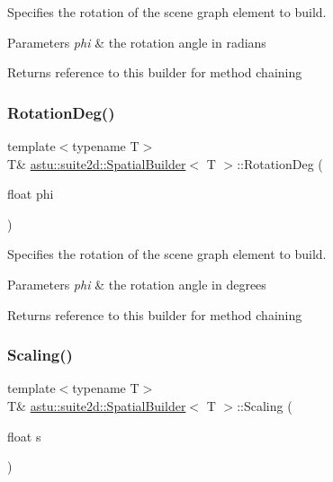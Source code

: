 Specifies the rotation of the scene graph element to build.


\begin{DoxyParams}{Parameters}
{\em phi} & the rotation angle in radians \\
\hline
\end{DoxyParams}
\begin{DoxyReturn}{Returns}
reference to this builder for method chaining 
\end{DoxyReturn}
\mbox{\label{classastu_1_1suite2d_1_1SpatialBuilder_aebb7300a60d30a4bf07723b977718e11}} 
\subsubsection{\texorpdfstring{Rotation\+Deg()}{RotationDeg()}}
{\footnotesize\ttfamily template$<$typename T$>$ \\
T\& \hyperlink{classastu_1_1suite2d_1_1SpatialBuilder}{astu\+::suite2d\+::\+Spatial\+Builder}$<$ T $>$\+::Rotation\+Deg (\begin{DoxyParamCaption}\item[{float}]{phi }\end{DoxyParamCaption})\hspace{0.3cm}{\ttfamily [inline]}}

Specifies the rotation of the scene graph element to build.


\begin{DoxyParams}{Parameters}
{\em phi} & the rotation angle in degrees \\
\hline
\end{DoxyParams}
\begin{DoxyReturn}{Returns}
reference to this builder for method chaining 
\end{DoxyReturn}
\mbox{\label{classastu_1_1suite2d_1_1SpatialBuilder_aca653817b053db2fe3c9d0640ab95f05}} 
\subsubsection{\texorpdfstring{Scaling()}{Scaling()}\hspace{0.1cm}{\footnotesize\ttfamily [1/3]}}
{\footnotesize\ttfamily template$<$typename T$>$ \\
T\& \hyperlink{classastu_1_1suite2d_1_1SpatialBuilder}{astu\+::suite2d\+::\+Spatial\+Builder}$<$ T $>$\+::Scaling (\begin{DoxyParamCaption}\item[{float}]{s }\end{DoxyParamCaption})\hspace{0.3cm}{\ttfamily [inline]}}

